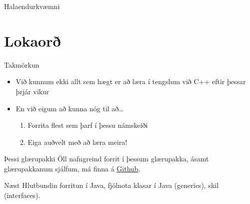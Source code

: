 \documentclass{beamer}
\begin{document}
\begin{frame}{Halaendurkvæmni}
\end{frame}

\section{Lokaorð}

\begin{frame}{Takmörkun}
	\begin{itemize}
		\item Við kunnum ekki allt sem hægt er að læra í tengslum við C++ eftir þessar þrjár vikur
		\item En við eigum að kunna nóg til að\ldots
		      \begin{enumerate}
			      \item Forrita flest sem þarf í þessu námskeiði
			      \item Eiga auðvelt með að læra meira!
		      \end{enumerate}
	\end{itemize}
\end{frame}

\begin{frame}{Þessi glærupakki}
	Öll nafngreind forrit í þessum glærupakka, ásamt glærupakkanum sjálfum, má finna á  \href{https://github.com/Ernir/kennsluefni/tree/master/T2/Code/w3}{Github}.
\end{frame}

\begin{frame}{Næst}
	Hlutbundin forritun í Java, fjölnota klasar í Java (generics), skil (interfaces).
\end{frame}
\end{document}
